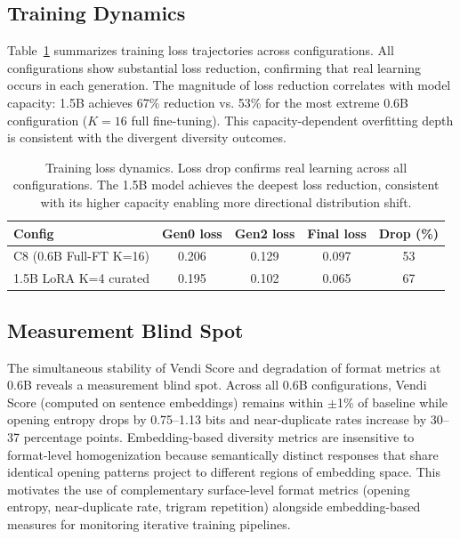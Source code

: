 \documentclass[11pt,a4paper]{article}
\begin{document}
\subsection{Training Dynamics}
\label{sec:training}

Table~\ref{tab:loss} summarizes training loss trajectories across configurations. All configurations show substantial loss reduction, confirming that real learning occurs in each generation. The magnitude of loss reduction correlates with model capacity: 1.5B achieves 67\% reduction vs. 53\% for the most extreme 0.6B configuration ($K{=}16$ full fine-tuning). This capacity-dependent overfitting depth is consistent with the divergent diversity outcomes.

\begin{table}[t]
\centering
\caption{Training loss dynamics. Loss drop confirms real learning across all configurations. The 1.5B model achieves the deepest loss reduction, consistent with its higher capacity enabling more directional distribution shift.}
\label{tab:loss}
\small
\begin{tabular}{@{}lcccc@{}}
\toprule
Config & Gen0 loss & Gen2 loss & Final loss & Drop (\%) \\
\midrule
C8 (0.6B Full-FT K=16) & 0.206 & 0.129 & 0.097 & 53 \\
1.5B LoRA K=4 curated & 0.195 & 0.102 & 0.065 & 67 \\
\bottomrule
\end{tabular}
\end{table}

\subsection{Measurement Blind Spot}
\label{sec:blindspot}

The simultaneous stability of Vendi Score and degradation of format metrics at 0.6B reveals a measurement blind spot. Across all 0.6B configurations, Vendi Score (computed on sentence embeddings) remains within $\pm$1\% of baseline while opening entropy drops by 0.75--1.13 bits and near-duplicate rates increase by 30--37 percentage points. Embedding-based diversity metrics are insensitive to format-level homogenization because semantically distinct responses that share identical opening patterns project to different regions of embedding space. This motivates the use of complementary surface-level format metrics (opening entropy, near-duplicate rate, trigram repetition) alongside embedding-based measures for monitoring iterative training pipelines.
\end{document}
